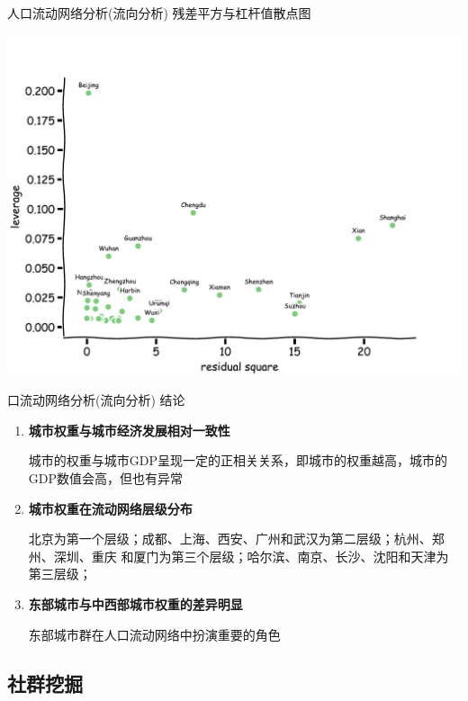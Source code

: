 \begin{frame}[t]{人口流动网络分析(流向分析)}
    残差平方与杠杆值散点图

    \includegraphics[scale=0.4]{figures/leverage.pdf}
\end{frame}

\begin{frame}[t]{口流动网络分析(流向分析)}
    \alert{结论}

    \begin{enumerate}
        \pause
        \item \textbf{城市权重与城市经济发展相对一致性}

        城市的权重与城市GDP呈现一定的正相关关系，即城市的权重越高，城市的GDP数值会高，但也有异常

        \pause
        \item \textbf{城市权重在流动网络层级分布}

        北京为第一个层级；成都、上海、西安、广州和武汉为第二层级；杭州、郑州、深圳、重庆
        和厦门为第三个层级；哈尔滨、南京、长沙、沈阳和天津为第三层级；

        \pause
        \item \textbf{东部城市与中西部城市权重的差异明显}

        东部城市群在人口流动网络中扮演重要的角色
    \end{enumerate}
\end{frame}



\subsection{社群挖掘}

